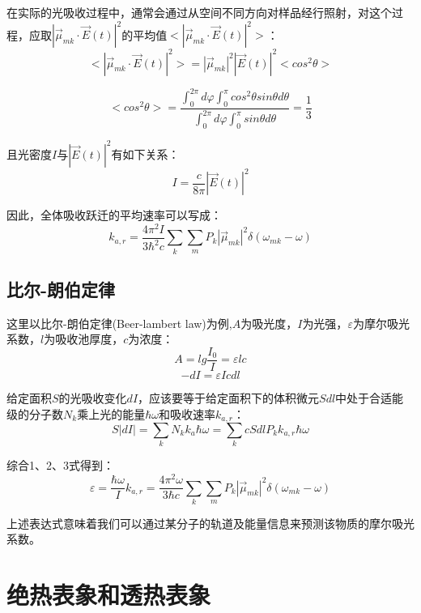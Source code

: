 在实际的光吸收过程中，通常会通过从空间不同方向对样品经行照射，对这个过程，应取$|\overrightarrow{\mu}_{mk} \cdot \overrightarrow{E}(t)|^2$的平均值$<|\overrightarrow{\mu}_{mk} \cdot \overrightarrow{E}(t)|^2>$：
\[<|\overrightarrow{\mu}_{mk} \cdot \overrightarrow{E}(t)|^2>=|\overrightarrow{\mu}_{mk}|^2|\overrightarrow{E}(t)|^2<cos^2 \theta>\]

\[<cos^2 \theta>=\frac{\int_0^{2\pi}d\varphi \int_0^{\pi}cos^2 \theta sin \theta d\theta}{\int_0^{2\pi}d\varphi \int_0^{\pi} sin \theta d\theta}=\frac{1}{3}\]

且光密度$I$与$|\overrightarrow{E}(t)|^2$有如下关系：
\[I=\frac{c}{8 \pi}|\overrightarrow{E}(t)|^2\]

因此，全体吸收跃迁的平均速率可以写成：
\[k_{a,r}=\frac{4\pi^2 I}{3 \hbar^2c}\sum_k\sum_m P_k |\overrightarrow{\mu}_{mk}|^2 \delta(\omega_{mk}-\omega)\]

\subsection{比尔-朗伯定律}

这里以比尔-朗伯定律(Beer-lambert law)为例,$A$为吸光度，$I$为光强，$\varepsilon$为摩尔吸光系数，$l$为吸收池厚度，$c$为浓度：
\[A=lg \frac{I_0}{I}=\varepsilon lc \tag{1}\]
\[-dI=\varepsilon Icdl \tag{2}\]

给定面积$S$的光吸收变化$dI$，应该要等于给定面积下的体积微元$Sdl$中处于合适能级的分子数$N_k$乘上光的能量$\hbar \omega$和吸收速率$k_{a,r}$：
\[S|dI|=\sum_kN_kk_a\hbar \omega=\sum_kcSdlP_kk_{a,r}\hbar \omega \tag{3}\]

综合1、2、3式得到：
\[\varepsilon=\frac{\hbar \omega}{I}k_{a,r}=\frac{4\pi^2 \omega}{3 \hbar c}\sum_k\sum_m P_k |\overrightarrow{\mu}_{mk}|^2 \delta(\omega_{mk}-\omega)\]

上述表达式意味着我们可以通过某分子的轨道及能量信息来预测该物质的摩尔吸光系数。

\section{绝热表象和透热表象}